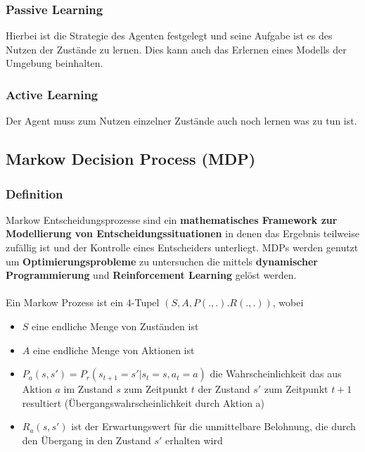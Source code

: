 \documentclass[10pt]{scrartcl}
\begin{document}
\subsubsection{Passive Learning}
Hierbei ist die Strategie des Agenten festgelegt und seine Aufgabe ist es des Nutzen der Zustände zu lernen. Dies kann auch das Erlernen eines Modells der Umgebung beinhalten.

\subsubsection{Active Learning}
Der Agent muss zum Nutzen einzelner Zustände auch noch lernen was zu tun ist.

\subsection{Markow Decision Process (MDP)}
\subsubsection{Definition}
Markow Entscheidungsprozesse sind ein \textbf{mathematisches Framework zur Modellierung von Entscheidungssituationen} in denen das Ergebnis teilweise zufällig ist und der Kontrolle eines Entscheiders unterliegt. MDPs werden genutzt um \textbf{Optimierungsprobleme} zu untersuchen die mittels \textbf{dynamischer Programmierung} und \textbf{Reinforcement Learning} gelöst werden.\\
\\
Ein Markow Prozess ist ein 4-Tupel $(S,A,P(.,.).R(.,.))$, wobei

\begin{itemize}
\item{$S$ eine endliche Menge von Zuständen ist}
\item{$A$ eine endliche Menge von Aktionen ist}
\item{$P_{a}(s,s') = P_{r}(s_{t+1} = s' | s_{t} = s, a_{t} = a)$ die Wahrscheinlichkeit das aus Aktion $a$ im Zustand $s$ zum Zeitpunkt $t$ der  Zustand $s'$ zum Zeitpunkt $t+1$ resultiert  (Übergangswahrscheinlichkeit durch Aktion a)}
\item{$R_{a}(s,s')$ ist der Erwartungswert für die unmittelbare Belohnung, die durch den Übergang in den Zustand $s'$ erhalten wird}
\end{itemize}
\end{document}
